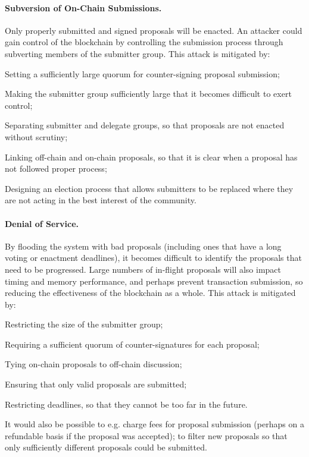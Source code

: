 \paragraph{Subversion of On-Chain Submissions.}
Only properly submitted and signed proposals will be enacted.  An attacker could gain control of the blockchain by controlling the submission process through
subverting members of the submitter group.
%
This attack is mitigated by:
  \begin{inparaenum}
  \item
    Setting a sufficiently large quorum for counter-signing proposal submission;
  \item
    Making the submitter group sufficiently large that it becomes difficult to exert control;
  \item
    Separating submitter and delegate groups, so that proposals are not enacted without scrutiny;
  \item
    Linking off-chain and on-chain proposals, so that it is clear when a proposal has not followed proper process;
  \item
    Designing an election process that allows submitters to be replaced where they are not acting in the best interest of the community.
  \end{inparaenum}


\paragraph{Denial of Service.}
By flooding the system with bad proposals (including ones that have a long voting or enactment deadlines), it becomes difficult to identify the
proposals that need to be progressed.
Large numbers of in-flight proposals will also impact timing and memory performance, and perhaps prevent transaction submission, so reducing
the effectiveness of the blockchain as a whole.
%
This attack is mitigated by:
  \begin{inparaenum}
  \item
    Restricting the size of the submitter group;
  \item
    Requiring a sufficient quorum of counter-signatures for each proposal;
  \item
    Tying on-chain proposals to off-chain discussion;
  \item
    Ensuring that only valid proposals are submitted;
  \item
    Restricting deadlines, so that they cannot be too far in the future.
  \end{inparaenum}
  It would also be possible to e.g. charge fees for proposal submission (perhaps on a refundable basis if the proposal was accepted);
  to filter new proposals so that only sufficiently different proposals could be submitted.

